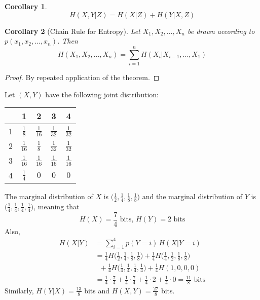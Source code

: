 \documentclass[a4paper, 12pt]{report}
\newtheorem{corollary}{Corollary}[theorem]
\theoremstyle{remark}
\theoremstyle{definition}
\begin{document}
\begin{corollary}
\[H(X, Y|Z) = H(X|Z) + H(Y|X, Z)\]
\end{corollary}

\begin{corollary}[Chain Rule for Entropy]
Let $X_1, X_2, ..., X_n$ be drawn according to $p(x_1, x_2, ..., x_n)$. Then 
\[H(X_1, X_2, ..., X_n) = \sum_{i = 1}^n H(X_i | X_{i-1}, ..., X_1)\]
\end{corollary}
\begin{proof}
By repeated application of the theorem. 
\end{proof}

\begin{example}
Let $(X, Y)$ have the following joint distribution: 
\begingroup
\renewcommand{\arraystretch}{1.4}
\begin{center}
\begin{tabular}{c|c|c|c|c}
     &1&2&3&4\\
     \hline
    1&$\frac{1}{8}$&$\frac{1}{16}$&$\frac{1}{32}$&$\frac{1}{32}$\\
    \hline
    2&$\frac{1}{16}$&$\frac{1}{8}$&$\frac{1}{32}$&$\frac{1}{32}$\\
    \hline
    3&$\frac{1}{16}$&$\frac{1}{16}$&$\frac{1}{16}$&$\frac{1}{16}$\\
    \hline
    4&$\frac{1}{4}$&$0$&$0$&$0$
\end{tabular}
\end{center}
\endgroup
The marginal distribution of $X$ is $\big(\frac{1}{2}, \frac{1}{4}, \frac{1}{8}, \frac{1}{8}\big)$ and the marginal distribution of $Y$ is $\big(\frac{1}{4}, \frac{1}{4}, \frac{1}{4}, \frac{1}{4}\big)$, meaning that
\[H(X) = \frac{7}{4} \text{ bits,  } H(Y) = 2 \text{ bits}\]
Also, 
\begin{align*}
    H(X|Y) & = \sum_{i=1}^4 p(Y=i)\, H(X|Y = i) \\
    & = \frac{1}{4} H\bigg(\frac{1}{2}, \frac{1}{4}, \frac{1}{8}, \frac{1}{8}\bigg) + \frac{1}{4} H\bigg(\frac{1}{4}, \frac{1}{2}, \frac{1}{8}, \frac{1}{8}\bigg) \\
    & \;\; + \frac{1}{4} H\bigg(\frac{1}{4}, \frac{1}{4}, \frac{1}{4}, \frac{1}{4}\bigg) + \frac{1}{4}H(1, 0, 0, 0) \\
    & = \frac{1}{4} \cdot \frac{7}{4} + \frac{1}{4} \cdot \frac{7}{4} + \frac{1}{4} \cdot 2 + \frac{1}{4} \cdot 0 = \frac{11}{8} \text{ bits}
\end{align*}
Similarly, $H(Y|X) = \frac{13}{8}$ bits and $H(X, Y) = \frac{27}{8}$ bits. 
\end{example}
\end{document}
